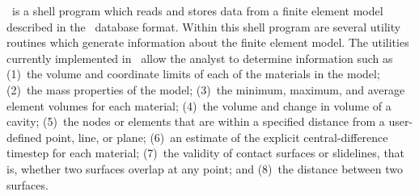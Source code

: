 \numbers\ is a shell program which reads and stores data from a finite
element model described in the \exo\ database format. Within this shell
program are several utility routines which generate information about
the finite element model.  The utilities currently implemented in
\numbers\ allow the analyst to determine information such as (1)~the
volume and coordinate limits of each of the materials in the model;
(2)~the mass properties of the model; (3)~the minimum, maximum, and
average element volumes for each material; (4)~the volume and change in
volume of a cavity; (5)~the nodes or elements that are within a
specified distance from a user-defined point, line, or plane; (6)~an
estimate of the explicit central-difference timestep for each material;
(7)~the validity of contact surfaces or slidelines, that is, whether two
surfaces overlap at any point; and (8)~the distance between two
surfaces. 


